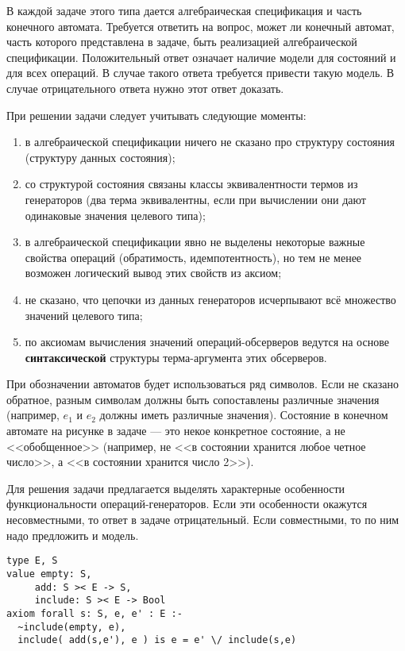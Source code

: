 

В каждой задаче этого типа дается алгебраическая спецификация и часть конечного автомата. Требуется ответить на вопрос, может ли конечный автомат, часть которого представлена в задаче, быть реализацией алгебраической спецификации. Положительный ответ означает наличие модели для состояний и для всех операций. В случае такого ответа требуется привести такую модель. В случае отрицательного ответа нужно этот ответ доказать.

При решении задачи следует учитывать следующие моменты:
\begin{enumerate}
\item в алгебраической спецификации ничего не сказано про структуру состояния (структуру данных состояния);
\item со структурой состояния связаны классы эквивалентности термов из генераторов (два терма эквивалентны, если при вычислении они дают одинаковые значения целевого типа);
\item в алгебраической спецификации явно не выделены некоторые важные свойства операций (обратимость, идемпотентность), но тем не менее возможен логический вывод этих свойств из аксиом;
\item не сказано, что цепочки из данных генераторов исчерпывают всё множество значений целевого типа;
\item по аксиомам вычисления значений операций-обсерверов ведутся на основе \textbf{синтаксической} структуры терма-аргумента этих обсерверов.
\end{enumerate}

При обозначении автоматов будет использоваться ряд символов. Если не сказано обратное, разным символам должны быть сопоставлены различные значения (например, $e_1$ и $e_2$ должны иметь различные значения). Состояние в конечном автомате на рисунке в задаче --- это некое конкретное состояние, а не <<обобщенное>> (например, не <<в состоянии хранится любое четное число>>, а <<в состоянии хранится число 2>>).

Для решения задачи предлагается выделять характерные особенности функциональности операций-генераторов. Если эти особенности окажутся несовместными, то ответ в задаче отрицательный. Если совместными, то по ним надо предложить и модель.

\z \begin{lstlisting}
type E, S
value empty: S,
     add: S >< E -> S,
     include: S >< E -> Bool
axiom forall s: S, e, e' : E :-
  ~include(empty, e),
  include( add(s,e'), e ) is e = e' \/ include(s,e)
\end{lstlisting}

